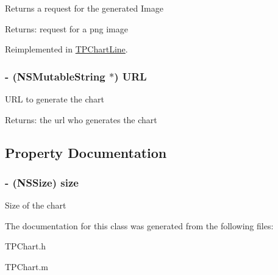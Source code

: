 Returns a request for the generated Image \begin{Desc}
\item[Returns:]request for a png image \end{Desc}


Reimplemented in \hyperlink{interface_t_p_chart_line_2fa4ce27ed67bce0c2d0d2a9b41c026c}{TPChartLine}.\hypertarget{interface_t_p_chart_0de05415b5d6de4d791a119a51468bf8}{
\subsubsection[{URL}]{\setlength{\rightskip}{0pt plus 5cm}- (NSMutableString $\ast$) URL }}
\label{interface_t_p_chart_0de05415b5d6de4d791a119a51468bf8}


URL to generate the chart \begin{Desc}
\item[Returns:]the url who generates the chart \end{Desc}


\subsection{Property Documentation}
\hypertarget{interface_t_p_chart_050f86ea651d6dee6d96cec69ff3a617}{
\subsubsection[{size}]{\setlength{\rightskip}{0pt plus 5cm}- (NSSize) size}}
\label{interface_t_p_chart_050f86ea651d6dee6d96cec69ff3a617}


Size of the chart 

The documentation for this class was generated from the following files:\begin{CompactItemize}
\item 
TPChart.h\item 
TPChart.m\end{CompactItemize}
